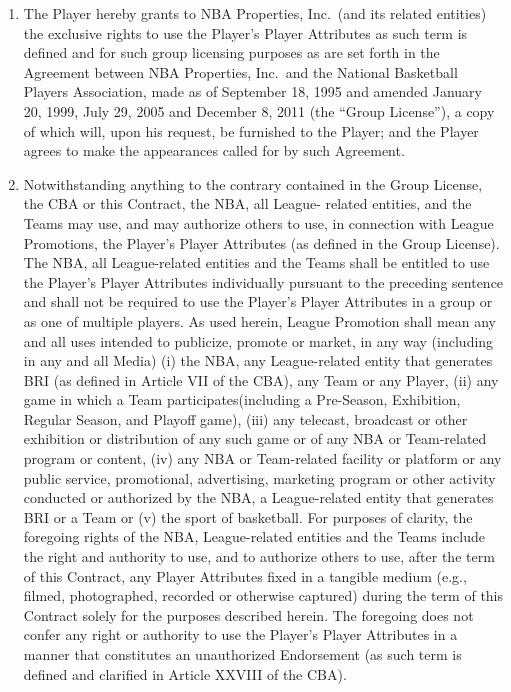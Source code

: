 \documentclass[
]{book}
\providecommand{\tightlist}{%
  \setlength{\itemsep}{0pt}\setlength{\parskip}{0pt}}
\begin{document}
\begin{enumerate}
\def\labelenumi{(\alph{enumi})}
\tightlist
\item
  The Player hereby grants to NBA Properties, Inc.~(and its related entities) the exclusive rights to use the Player's Player Attributes as such term is defined and for such group licensing purposes as are set forth in the Agreement between NBA Properties, Inc.~and the National Basketball Players Association, made as of September 18, 1995 and amended January 20, 1999, July 29, 2005 and December 8, 2011 (the ``Group License''), a copy of which will, upon his request, be furnished to the Player; and the Player agrees to make the appearances called for by such Agreement.
\item
  Notwithstanding anything to the contrary contained in the Group License, the CBA or this Contract, the NBA, all League- related entities, and the Teams may use, and may authorize others to use, in connection with League Promotions, the Player's Player Attributes (as defined in the Group License). The NBA, all League-related entities and the Teams shall be entitled to use the Player's Player Attributes individually pursuant to the preceding sentence and shall not be required to use the Player's Player Attributes in a group or as one of multiple players. As used herein, League Promotion shall mean any and all uses intended to publicize, promote or market, in any way (including in any and all Media) (i) the NBA, any League-related entity that generates BRI (as defined in Article VII of the CBA), any Team or any Player, (ii) any game in which a Team participates(including a Pre-Season, Exhibition, Regular Season, and Playoff game), (iii) any telecast, broadcast or other exhibition or distribution of any such game or of any NBA or Team-related program or content, (iv) any NBA or Team-related facility or platform or any public service, promotional, advertising, marketing program or other activity conducted or authorized by the NBA, a League-related entity that generates BRI or a Team or (v) the sport of basketball. For purposes of clarity, the foregoing rights of the NBA, League-related entities and the Teams include the right and authority to use, and to authorize others to use, after the term of this Contract, any Player Attributes fixed in a tangible medium (e.g., filmed, photographed, recorded or otherwise captured) during the term of this Contract solely for the purposes described herein. The foregoing does not confer any right or authority to use the Player's Player Attributes in a manner that constitutes an unauthorized Endorsement (as such term is defined and clarified in Article XXVIII of the CBA).

\end{enumerate}
\end{document}
